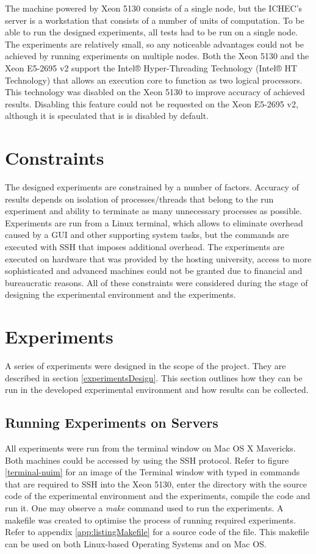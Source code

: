 The machine powered by Xeon 5130 consists of a single node, but the ICHEC's server is a workstation that consists of a number of units of computation. To be able to run the designed experiments, all tests had to be run on a single node. The experiments are relatively small, so any noticeable advantages could not be achieved by running experiments on multiple nodes. Both the Xeon 5130 and the Xeon E5-2695 v2 support the Intel® Hyper-Threading Technology (Intel® HT Technology) that allows an execution core to function as two logical processors. This technology was disabled on the Xeon 5130 to improve accuracy of achieved results. Disabling this feature could not be requested on the Xeon E5-2695 v2, although it is speculated that is is disabled by default.

\section{Constraints}
The designed experiments are constrained by a number of factors. Accuracy of results depends on isolation of processes/threads that belong to the run experiment and ability to terminate as many unnecessary processes as possible. Experiments are run from a Linux terminal, which allows to eliminate overhead caused by a GUI and other supporting system tasks, but the commands are executed with SSH that imposes additional overhead. The experiments are executed on hardware that was provided by the hosting university, access to more sophisticated and advanced machines could not be granted due to financial and bureaucratic reasons. All of these constraints were considered during the stage of designing the experimental environment and the experiments.

\section{Experiments}

A series of experiments were designed in the scope of the project. They are described in section \ref{experimentsDesign}. This section outlines how they can be run in the developed experimental environment and how results can be collected.

\subsection{Running Experiments on Servers}

All experiments were run from the terminal window on Mac OS X Mavericks. Both machines could be accessed by using the SSH protocol. Refer to figure \ref{terminal-nuim} for an image of the Terminal window with typed in commands that are required to SSH into the Xeon 5130, enter the directory with the source code of the experimental environment and the experiments, compile the code and run it. One may observe a \textit{make} command used to run the experiments. A makefile was created to optimise the process of running required experiments. Refer to appendix \ref{app:listingMakefile} for a source code of the file. This makefile can be used on both Linux-based Operating Systems and on Mac OS.

